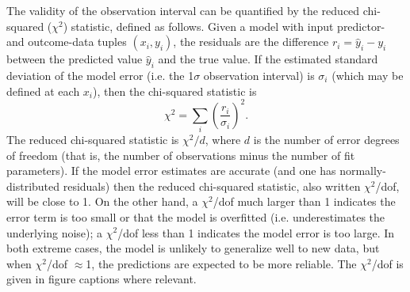	The validity of the observation interval can be quantified by the reduced chi-squared ($\chi^2$) statistic, defined as follows.
	Given a model with input predictor- and outcome-data tuples $(x_i,y_i)$, the residuals are the difference $r_i=\hat{y}_i - y_i$ between the predicted value $\hat{y}_i$ and the true value. 
	If the estimated standard deviation of the model error (i.e. the 1$\sigma$ observation interval) is $\sigma_i$ (which may be defined at each $x_i$), then the chi-squared statistic is 
	\begin{equation}
	\chi^2 = \sum_i \left(\frac{r_i}{\sigma_i}\right)^2.
	\end{equation}
	The reduced chi-squared statistic is $\chi^2/d$, where $d$ is the number of error degrees of freedom (that is, the number of observations minus the number of fit parameters).
	If the model error estimates are accurate (and one has normally-distributed residuals) then the reduced chi-squared statistic, also written $\chi^2$/dof, will be close to 1.
	On the other hand, a $\chi^2$/dof much larger than 1 indicates the error term is too small or that the model is overfitted (i.e. underestimates the underlying noise); a $\chi^2$/dof less than 1 indicates the model error is too large. In both extreme cases, the model is unlikely to generalize well to new data, but when $\chi^2$/dof $\approx$1, the predictions are expected to be more reliable. The $\chi^2$/dof is given in figure captions where relevant.

	












